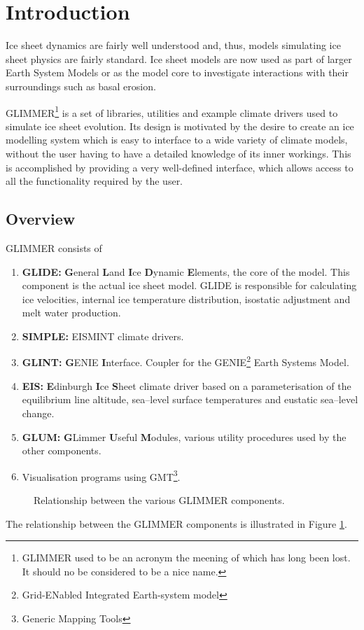 \section{Introduction}
Ice sheet dynamics are fairly well understood and, thus, models simulating ice sheet physics are fairly standard. Ice sheet models are now used as part of larger Earth System Models or as the model core to investigate interactions with their surroundings such as basal erosion. 

GLIMMER\footnote{GLIMMER used to be an acronym the meening of which has long been lost. It should no be considered to be a nice name.} is a set of libraries, utilities and example climate drivers used to simulate ice sheet evolution. Its design is motivated by the desire to create an ice modelling system which is easy to interface to a wide variety of climate models, without the user having to have a detailed knowledge of its inner workings. This is accomplished by providing a very well-defined interface, which allows access to all the functionality required by the user.

\subsection{Overview}
GLIMMER consists of
\begin{enumerate}
\item {\bf GLIDE:} {\bf G}eneral {\bf L}and {\bf I}ce {\bf D}ynamic {\bf E}lements, the core of the model.  This component is the actual ice sheet model. GLIDE is responsible for calculating ice velocities, internal ice temperature distribution, isostatic adjustment and melt water production.
\item {\bf SIMPLE:} EISMINT climate drivers.
\item {\bf GLINT:} {\bf G}ENIE {\bf I}nterface. Coupler for the GENIE\footnote{Grid-ENabled Integrated Earth-system model} Earth Systems Model.
\item {\bf EIS:} {\bf E}dinburgh {\bf I}ce {\bf S}heet climate driver based on a parameterisation of the equilibrium line altitude, sea--level surface temperatures and eustatic sea--level change.
\item {\bf GLUM:} {\bf G}Limmer {\bf U}seful {\bf M}odules, various utility procedures used by the other components.
\item Visualisation programs using GMT\footnote{Generic Mapping Tools}.
\end{enumerate}
\begin{figure}[htbp]
  \centering
  \caption{Relationship between the various GLIMMER components.}
  \label{ug.fig.glimmer}
\end{figure}
The relationship between the GLIMMER components is illustrated in Figure \ref{ug.fig.glimmer}.



